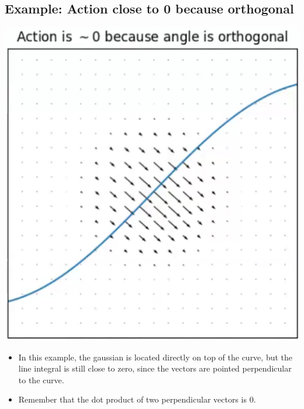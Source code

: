 \documentclass[10pt]{article}
\begin{document}
\subsection*{Example: Action close to 0 because orthogonal}
\begin{center}
    \includegraphics*[scale=0.6]{W3_5.png}
\end{center}
\begin{itemize}
    \item In this example, the gaussian is located directly on top of the curve, but the line integral is still close to zero, since the vectors are pointed perpendicular to the curve.
    \item Remember that the dot product of two perpendicular vectors is 0.
\end{itemize}
\end{document}
